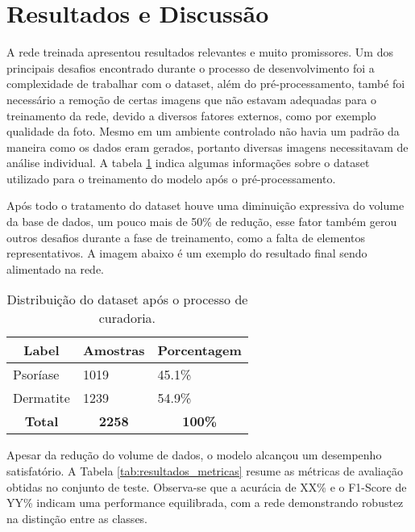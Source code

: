 \section{Resultados e Discussão}

A rede treinada apresentou resultados relevantes e muito promissores. Um dos principais desafios encontrado durante o processo de desenvolvimento foi a complexidade de trabalhar com o dataset, além do pré-processamento, també foi necessário a remoção de certas imagens que não estavam adequadas para o treinamento da rede, devido a diversos fatores externos, como por exemplo qualidade da foto. Mesmo em um ambiente controlado não havia um padrão da maneira como os dados eram gerados, portanto diversas imagens necessitavam de análise individual. A tabela \ref{tab:db-table} indica algumas informações sobre o dataset utilizado para o treinamento do modelo após o pré-processamento. 

Após todo o tratamento do dataset houve uma diminuição expressiva do volume da base de dados, um pouco mais de 50\% de redução, esse fator também gerou outros desafios durante a fase de treinamento, como a falta de elementos representativos. A imagem abaixo é um exemplo do resultado final sendo alimentado na rede.

\newline
\begin{table}[h]
  \centering
  \label{tab:db-table}
  \begin{tabular}{|l|l|l|}
  \hline
  \multicolumn{1}{|c|}{\textbf{Label}} & \multicolumn{1}{c|}{\textbf{Amostras}} & \multicolumn{1}{c|}{\textbf{Porcentagem}} \\ \hline
  Psoríase                             & 1019                                   & 45.1\%                                  \\ \hline
  Dermatite                            & 1239                                   & 54.9\%                                  \\ \hline
  \multicolumn{1}{|c|}{\textbf{Total}} & \multicolumn{1}{c|}{\textbf{2258}}     & \multicolumn{1}{c|}{\textbf{100\%}}     \\ \hline
  \end{tabular}
  \caption{Distribuição do dataset após o processo de curadoria.}
\end{table}

Apesar da redução do volume de dados, o modelo alcançou um desempenho satisfatório. A Tabela \ref{tab:resultados_metricas} resume as métricas de avaliação obtidas no conjunto de teste. Observa-se que a acurácia de XX\% e o F1-Score de YY\% indicam uma performance equilibrada, com a rede demonstrando robustez na distinção entre as classes.

